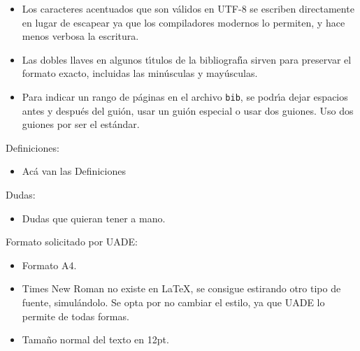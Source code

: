 \begin{itemize}
    \item Los caracteres acentuados que son v\'alidos en UTF-8 se escriben directamente en lugar de escapear ya que los compiladores modernos lo permiten, y hace menos verbosa la escritura.
    \item Las dobles llaves en algunos t\'{\i}tulos de la bibliograf\'{\i}a sirven para preservar el formato exacto, incluidas las min\'usculas y may\'usculas.
    \item Para indicar un rango de p\'aginas en el archivo \texttt{bib}, se podr\'{\i}a dejar espacios antes y despu\'es del gui\'on, usar un gui\'on especial o usar dos guiones. Uso dos guiones por ser el est\'andar.
\end{itemize}

Definiciones:
\begin{itemize}
    \item Acá van las Definiciones
\end{itemize}

Dudas:
\begin{itemize}
    \item Dudas que quieran tener a mano.
\end{itemize}

Formato solicitado por UADE:
\begin{itemize}
    \item Formato A4.
    \item Times New Roman no existe en LaTeX, se consigue estirando otro tipo de fuente, simul\'andolo. Se opta por no cambiar el estilo, ya que UADE lo permite de todas formas.
    \item Tama\~no normal del texto en 12pt.
\end{itemize}